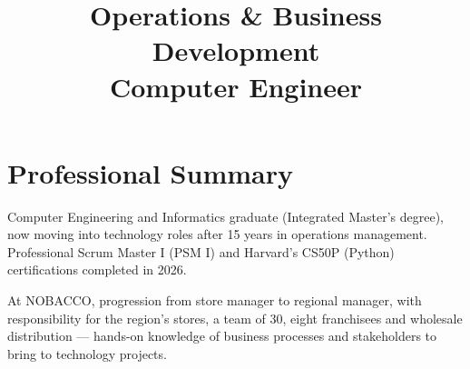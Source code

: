 \documentclass[10pt,a4paper,sans]{moderncv}
\title{Operations \& Business Development\texorpdfstring{\\}{ · }Computer Engineer}  %
\let\cvsectionplain\section
\renewcommand*{\section}[1]{\par\ifdim\dimexpr\pagegoal-\pagetotal\relax<5\baselineskip\newpage\fi\cvsectionplain{#1}}
\begin{document}
\makecvtitle

\section{Professional Summary}
Computer Engineering and Informatics graduate (Integrated Master’s degree), now moving into technology roles after 15 years in operations management. Professional Scrum Master I (PSM I) and Harvard’s CS50P (Python) certifications completed in 2026.

\smallskip
At NOBACCO, progression from store manager to regional manager, with responsibility for the region’s stores, a team of 30, eight franchisees and wholesale distribution — hands-on knowledge of business processes and stakeholders to bring to technology projects.
\end{document}
